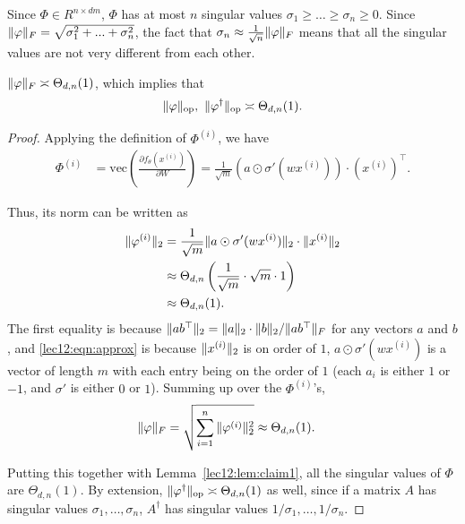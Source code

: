 \begin{remark}
Since $\Phi \in R^{n \times dm}$, $\Phi$ has at most $n$ singular values $\sigma_1 \geq \ldots \geq \sigma_n \geq 0$. Since $\|\varphi\|_F = \sqrt{\sigma_1^2 + ... + \sigma_n^2}$, the fact that $\sigma_n \approx \frac{1}{\sqrt{n}} \|\varphi\|_F$ means that all the singular values are not very different from each other.
\end{remark}

\begin{lemma}\label{lec12:lem:phi-norm}
$\|\varphi\|_F \asymp \Theta_{d,n}(1)$, which implies that
\begin{equation}
\|\varphi\|_{\text{op}}, \ \|\varphi^\dagger\|_{\text{op}}  \asymp \Theta_{d,n}(1).
\end{equation}
\end{lemma}

\begin{proof}
Applying the definition of $\Phi^{(i)}$, we have 
\begin{align}
    \Phi^{(i)} &= \text{vec}\left(\frac{\partial f_{\theta}(x^{(i)})}{\partial W}\right) = \frac{1}{\sqrt{m}} (a \odot \sigma' (w x^{(i)})) \cdot \left(x^{(i)}\right)^\top.
\end{align}

Thus, its norm can be written as
\begin{align}
\|\varphi^{(i)}\|_2 &= \frac{1}{\sqrt{m}} \|a \odot \sigma' (w x^{(i)})\|_2 \cdot \|x^{(i)}\|_2  \\
&\approx \Theta_{d,n}\left(\frac{1}{\sqrt{m}} \cdot \sqrt{m} \cdot 1 \right) \label{lec12:eqn:approx} \\
&\approx \Theta_{d,n}(1).
\end{align}
The first equality is because $\|ab^\top\|_2 = \|a\|_2 \cdot \|b\|_2 / \|ab^\top\|_F$ for any vectors $a$ and $b$, and \eqref{lec12:eqn:approx} is because $\|x^{(i)}\|_2$ is on order of $1$, $a \odot \sigma' (w x^{(i)})$ is a vector of length $m$ with each entry being on the order of $1$ (each $a_i$ is either $1$ or $-1$, and $\sigma'$ is either $0$ or $1$). Summing up over the $\Phi^{(i)}$'s,
\begin{align}
\|\varphi\|_F &= \sqrt{\sum_{i=1}^n \|\varphi^{(i)}\|_2^2} \approx \Theta_{d,n}(1).
\end{align}

Putting this together with Lemma~\ref{lec12:lem:claim1}, all the singular values of $\Phi$ are $\Theta_{d,n}(1)$. By extension,  $\|\varphi^\dagger\|_{\text{op}} \asymp \Theta_{d,n}(1)$ as well, since if a matrix $A$ has singular values $\sigma_1, \dots,\sigma_n$, $A^\dagger$ has singular values $1 / \sigma_1, \dots,1/\sigma_n$. 
\end{proof}

